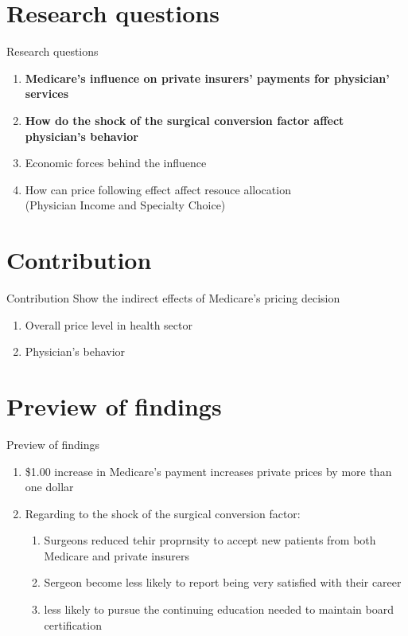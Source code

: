 \documentclass{beamer}
\begin{document}
\section{Research questions}
\begin{frame}{Research questions}
\begin{enumerate}
\item \textbf{Medicare's influence on private insurers' payments for physician' services}
\item \textbf{How do the shock of the surgical conversion factor affect physician's behavior}
\item  Economic forces behind the influence 
\item  How can price following effect affect resouce allocation\\
(Physician Income and Specialty Choice)
\end{enumerate}
\end{frame}

\section{Contribution}
\begin{frame}{Contribution}
Show the indirect effects of Medicare's pricing decision
\begin{enumerate}
\item Overall price level in health sector
\item Physician's behavior
\end{enumerate}
\end{frame}

\section{Preview of findings}
\begin{frame}{Preview of findings}
\begin{enumerate}
\item \$1.00 increase in Medicare's payment increases private prices by more than one dollar
\item Regarding to the shock of the surgical conversion factor:
\begin{enumerate}
\item Surgeons reduced tehir proprnsity to accept new patients from both Medicare and private insurers
\item Sergeon become less likely to report being very satisfied with their career
\item less likely to pursue the continuing education needed to maintain board certification
\end{enumerate}
\end{enumerate}

\end{frame}
\end{document}
